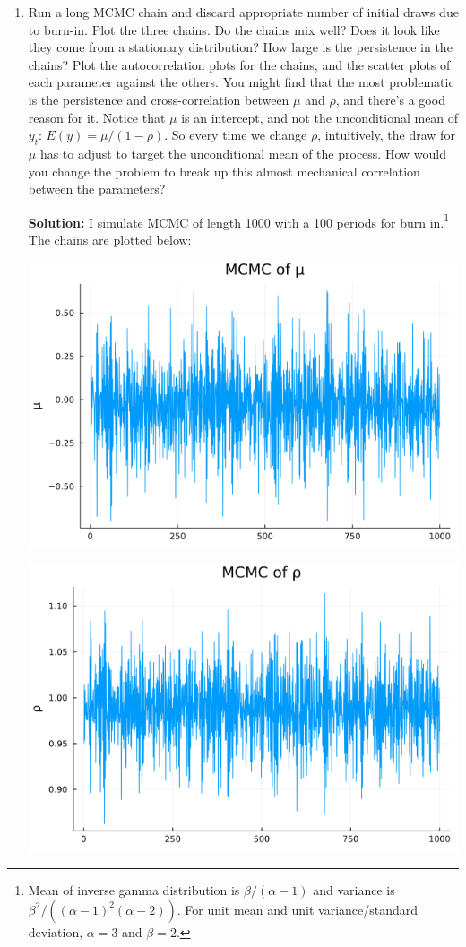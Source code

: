 \documentclass{article}
\begin{document}
\begin{enumerate}
\item Run a long MCMC chain and discard appropriate number of initial draws due to burn-in.
Plot the three chains. Do the chains mix well? Does it look like they come from a stationary
distribution? How large is the persistence in the chains? Plot the autocorrelation plots for
the chains, and the scatter plots of each parameter against the others. You might find that
the most problematic is the persistence and cross-correlation between $\mu$ and $\rho$, and there's a good reason for it. Notice that $\mu$ is an intercept, and not the unconditional mean of $y_t$: $E(y) = \mu/(1 - \rho)$. So every time we change $\rho$, intuitively, the draw for $\mu$ has to adjust to
target the unconditional mean of the process. How would you change the problem to break
up this almost mechanical correlation between the parameters?

\textbf{Solution:} I simulate MCMC of length 1000 with a 100 periods for burn in.\footnote{Mean of inverse gamma distribution is $\beta/(\alpha-1)$ and variance is $\beta^2/((\alpha - 1)^2(\alpha-2))$. For unit mean and unit variance/standard deviation, $\alpha = 3$ and $\beta = 2$.}  The chains are plotted below:

\begin{center}

\includegraphics[scale=0.5]{p2_q3_mu.png}

\includegraphics[scale=0.5]{p2_q3_rho.png}


\end{center}
\end{enumerate}
\end{document}
